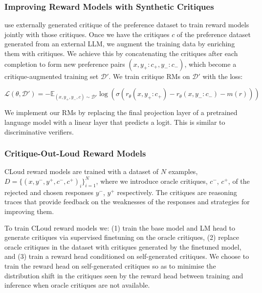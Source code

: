 \subsubsection{Improving Reward Models with Synthetic Critiques}

\autocite{ye2024improvingrewardmodelssynthetic} use externally generated critique of the preference dataset to train reward models jointly with those critiques. Once we have the critiques $c$ of the preference dataset generated from an external LLM, we augment the training data by enriching them with critiques. We achieve this by concatenating the critiques after each completion to form new preference pairs $(x, y_+ : c_+, y_- : c_-)$, which become a critique-augmented training set $\mathcal{D}'$. We train critique RMs on $\mathcal{D}'$ with the loss:

\begin{equation}
    \mathcal{L}(\theta, \mathcal{D}') = -\mathbb{E}_{(x,y_+,y_-,c)\sim \mathcal{D}'} \log(\sigma(r_\theta(x,y_+ : c_+) - r_\theta(x,y_- : c_-) - m(r)))
\end{equation}

We implement our RMs by replacing the final projection layer of a pretrained language model with a linear layer that predicts a logit. This is similar to discriminative verifiers.

\subsubsection{Critique-Out-Loud Reward Models}

CLoud reward models \autocite{ankner2024critiqueoutloudrewardmodels} are trained with a dataset of $N$ examples, $D = \{(x, y^-, y^+, c^-, c^+)_i\}^N_{i=1}$, where we introduce oracle critiques, $c^-$, $c^+$, of the rejected and chosen responses $y^-$, $y^+$ respectively. The critiques are reasoning traces that provide feedback on the weaknesses of the responses and strategies for improving them.

To train CLoud reward models we: (1) train the base model and LM head to generate critiques via supervised finetuning on the oracle critiques, (2) replace oracle critiques in the dataset with critiques generated by the finetuned model, and (3) train a reward head conditioned on self-generated critiques. We choose to train the reward head on self-generated critiques so as to minimise the distribution shift in the critiques seen by the reward head between training and inference when oracle critiques are not available.

